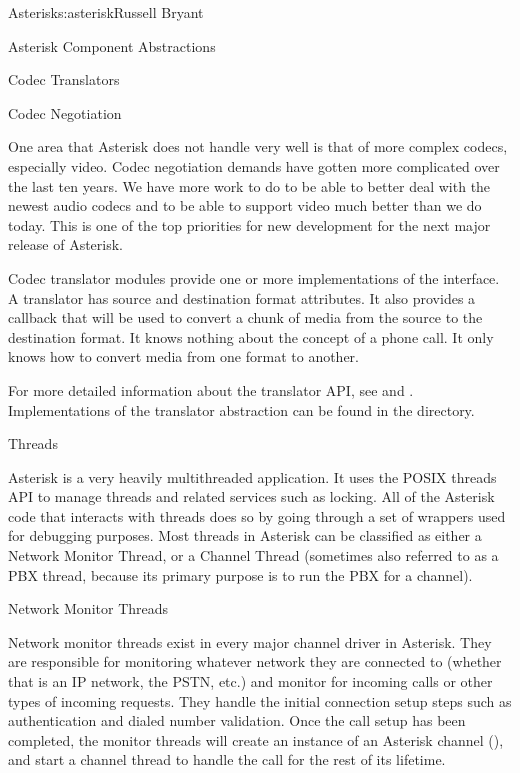 \begin{aosachapter}{Asterisk}{s:asterisk}{Russell Bryant}
\begin{aosasect1}{Asterisk Component Abstractions}
\begin{aosasect2}{Codec Translators}
\begin{aosabox}{Codec Negotiation}
\begin{aosaenumerate}
\end{aosaenumerate}

One area that Asterisk does not handle very well is that of more
complex codecs, especially video. Codec negotiation demands have
gotten more complicated over the last ten years. We have more work to
do to be able to better deal with the newest audio codecs and to be
able to support video much better than we do today. This is one of the
top priorities for new development for the next major release of
Asterisk.

\end{aosabox}

Codec translator modules provide one or more implementations of the
 interface. A translator has source and
destination format attributes. It also provides a callback that will
be used to convert a chunk of media from the source to the destination
format. It knows nothing about the concept of a phone call. It only
knows how to convert media from one format to another.

For more detailed information about the translator API, see
 and
. Implementations of the translator abstraction
can be found in the  directory.

\end{aosasect2}

\end{aosasect1}

\begin{aosasect1}{Threads}

Asterisk is a very heavily multithreaded application. It uses the
POSIX threads API to manage threads and related services such as
locking.  All of the Asterisk code that interacts with threads does so
by going through a set of wrappers used for debugging purposes. Most
threads in Asterisk can be classified as either a Network Monitor
Thread, or a Channel Thread (sometimes also referred to as a PBX
thread, because its primary purpose is to run the PBX for a channel).

\begin{aosasect2}{Network Monitor Threads}

Network monitor threads exist in every major channel driver in
Asterisk. They are responsible for monitoring whatever network they
are connected to (whether that is an IP network, the PSTN, etc.) and
monitor for incoming calls or other types of incoming requests. They
handle the initial connection setup steps such as authentication and
dialed number validation. Once the call setup has been completed, the
monitor threads will create an instance of an Asterisk channel
(), and start a channel thread to handle the call
for the rest of its lifetime.


\end{aosasect2}
\end{aosasect1}
\end{aosachapter}

